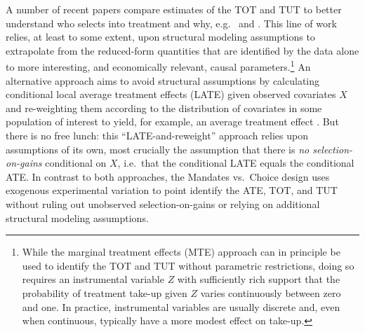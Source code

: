 \documentclass[12pt, a4paper, colorinlistoftodos]{article}
\begin{document}
A number of recent papers compare estimates of the TOT and TUT to better understand who selects into treatment and why, e.g.\ \cite{cornelissen2018benefits} and \cite{Walters}. 
This line of work relies, at least to some extent, upon structural modeling assumptions to extrapolate from the reduced-form quantities that are identified by the data alone to more interesting, and economically relevant, causal parameters.\footnote{While the marginal treatment effects (MTE) approach \citep{heckman2007econometric} can in principle be used to identify the TOT and TUT without parametric restrictions, doing so requires an instrumental variable $Z$ with sufficiently rich support that the probability of treatment take-up given $Z$ varies continuously between zero and one. In practice, instrumental variables are usually discrete and, even when continuous, typically have a more modest effect on take-up.} 
An alternative approach aims to avoid structural assumptions by calculating conditional local average treatment effects (LATE) given observed covariates $X$ and re-weighting them according to the distribution of covariates in some population of interest to yield, for example, an average treatment effect \citep{aronow2013beyond,angrist2013extrapolate}. 
But there is no free lunch: this ``LATE-and-reweight'' approach relies upon assumptions of its own, most crucially the assumption that there is \emph{no selection-on-gains} conditional on $X$, i.e.\ that the conditional LATE equals the conditional ATE. 
In contrast to both approaches, the Mandates vs.\ Choice design uses exogenous experimental variation to point identify the ATE, TOT, and TUT without ruling out unobserved selection-on-gains or relying on additional structural modeling assumptions.
\end{document}
